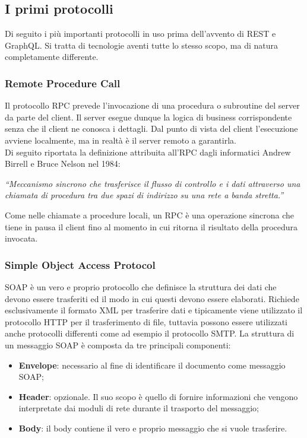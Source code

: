 \subsection*{I primi protocolli}
Di seguito i più importanti protocolli in uso prima dell'avvento di REST e GraphQL. Si tratta di tecnologie aventi tutte lo stesso scopo, ma di natura completamente differente.
\subsubsection*{Remote Procedure Call}
Il protocollo RPC prevede l'invocazione di una procedura o subroutine del server da parte del client. Il server esegue dunque la logica di business corrispondente senza che il client ne conosca i dettagli. Dal punto di vista del client l'esecuzione avviene localmente, ma in realtà è il server remoto a garantirla.\\
Di seguito riportata la definizione attribuita all'RPC dagli informatici Andrew Birrell e Bruce Nelson nel 1984:
  \begin{quoting}
    \textit{“Meccanismo sincrono che trasferisce il flusso di controllo e i dati attraverso una chiamata di procedura tra due spazi di indirizzo su una rete a banda stretta.”}
  \end{quoting}
Come nelle chiamate a procedure locali, un RPC è una operazione sincrona che tiene in pausa il client fino al momento in cui ritorna il risultato della procedura invocata.
\subsubsection*{Simple Object Access Protocol}
SOAP è un vero e proprio protocollo che definisce la struttura dei dati che devono essere trasferiti ed il modo in cui questi devono essere elaborati. Richiede esclusivamente il formato XML per trasferire dati e tipicamente viene utilizzato il protocollo HTTP per il trasferimento di file, tuttavia possono essere utilizzati anche protocolli differenti come ad esempio il protocollo SMTP. La struttura di un messaggio SOAP è composta da tre principali componenti:
\begin{itemize}
  \item \textbf{Envelope}: necessario al fine di identificare il documento come messaggio SOAP;
  \item \textbf{Header}: opzionale. Il suo scopo è quello di fornire informazioni che vengono interpretate dai moduli di rete durante il trasporto del messaggio;
  \item \textbf{Body}: il body contiene il vero e proprio messaggio che si vuole trasferire.
\end{itemize}
